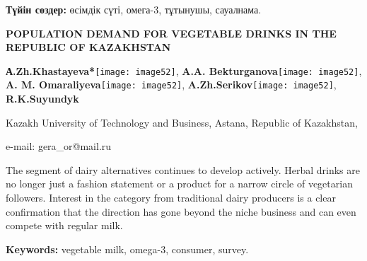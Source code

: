 {\bfseries Түйін сөздер:} өсімдік сүті, омега-3, тұтынушы, сауалнама.

\begin{center}
{\large\bfseries POPULATION DEMAND FOR VEGETABLE DRINKS IN THE REPUBLIC OF
KAZAKHSTAN}

\vspace{1em}
{\bfseries А.Zh.Khastayeva*}\texttt{[image: image52]},
{\bfseries A.A. Bekturganova}\texttt{[image: image52]},
{\bfseries A. M. Omaraliyeva}\texttt{[image: image52]},
{\bfseries A.Zh.Serikov}\texttt{[image: image52]},
{\bfseries R.K.Suyundyk}

Kazakh University of Technology and Business, Astana, Republic of
Kazakhstan,

e-mail: gera\_or@mail.ru
\end{center}

The segment of dairy alternatives continues to develop actively. Herbal
drinks are no longer just a fashion statement or a product for a narrow
circle of vegetarian followers. Interest in the category from
traditional dairy producers is a clear confirmation that the direction
has gone beyond the niche business and can even compete with regular
milk.

{\bfseries Keywords:} vegetable milk, omega-3, consumer, survey.

